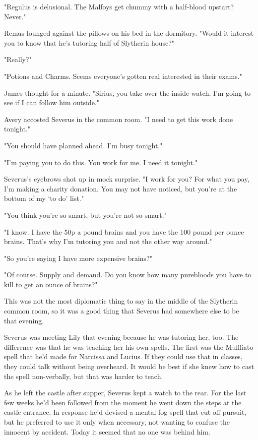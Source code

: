 "Regulus is delusional. The Malfoys get chummy with a half-blood upstart? Never."

Remus lounged against the pillows on his bed in the dormitory. "Would it interest you to know that he's tutoring half of Slytherin house?"

"Really?"

"Potions and Charms. Seems everyone's gotten real interested in their exams."

James thought for a minute. "Sirius, you take over the inside watch. I'm going to see if I can follow him outside."

Avery accosted Severus in the common room. "I need to get this work done tonight."

"You should have planned ahead. I'm busy tonight."

"I'm paying you to do this. You work for me. I need it tonight."

Severus's eyebrows shot up in mock surprise. "I work for you? For what you pay, I'm making a charity donation. You may not have noticed, but you're at the bottom of my `to do' list."

"You think you're so smart, but you're not so smart."

"I know. I have the 50p a pound brains and you have the 100 pound per ounce brains. That's why I'm tutoring you and not the other way around."

"So you're saying I have more expensive brains?"

"Of course. Supply and demand. Do you know how many purebloods you have to kill to get an ounce of brains?"

This was not the most diplomatic thing to say in the middle of the Slytherin common room, so it was a good thing that Severus had somewhere else to be that evening.

Severus was meeting Lily that evening because he was tutoring her, too. The difference was that he was teaching her his own spells. The first was the Muffliato spell that he'd made for Narcissa and Lucius. If they could use that in classes, they could talk without being overheard. It would be best if she knew how to cast the spell non-verbally, but that was harder to teach.

As he left the castle after supper, Severus kept a watch to the rear. For the last few weeks he'd been followed from the moment he went down the steps at the castle entrance. In response he'd devised a mental fog spell that cut off pursuit, but he preferred to use it only when necessary, not wanting to confuse the innocent by accident. Today it seemed that no one was behind him.

